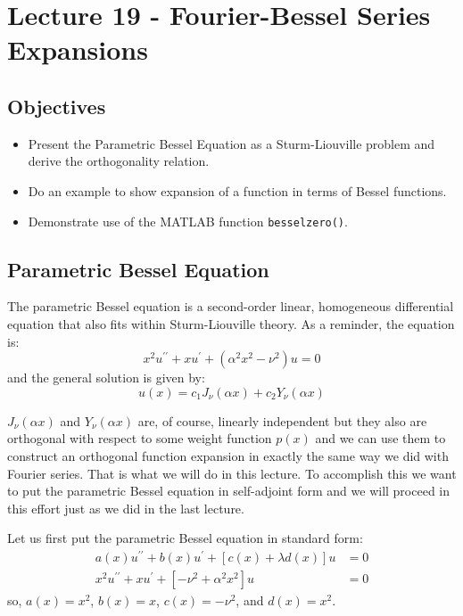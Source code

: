 \chapter{Lecture 19 - Fourier-Bessel Series Expansions}
\label{ch:lec19}
\section{Objectives}
\begin{itemize}
\item Present the Parametric Bessel Equation as a Sturm-Liouville problem and derive the orthogonality relation.
\item Do an example to show expansion of a function in terms of Bessel functions.
\item Demonstrate use of the MATLAB function \lstinline{besselzero()}.
\end{itemize}

\section{Parametric Bessel Equation}
The parametric Bessel equation is a second-order linear, homogeneous differential equation that also fits within Sturm-Liouville theory.  As a reminder, the equation is:
\begin{equation*}
x^2u^{\prime \prime} + xu^{\prime} + \left(\alpha^2x^2-\nu^2\right)u = 0
\end{equation*}
and the general solution is given by:
\begin{equation*}
u(x) = c_1J_{\nu}(\alpha x) + c_2Y_{\nu}(\alpha x)
\end{equation*}

 $J_{\nu}(\alpha x)$ and $Y_{\nu}(\alpha x)$ are, of course, linearly independent but they also are orthogonal with respect to some weight function $p(x)$ and we can use them to construct an orthogonal function expansion in exactly the same way we did with Fourier series.  That is what we will do in this lecture.  To accomplish this we want to put the parametric Bessel equation in self-adjoint form and we will proceed in this effort just as we did in the last lecture.

\vspace{0.5cm}

\noindent Let us first put the parametric Bessel equation in standard form:
\begin{align*}
a(x)u^{\prime \prime} + b(x)u^{\prime} + \left[c(x)+\lambda d(x) \right] u &= 0 \\
x^2u^{\prime \prime} + xu^{\prime} + \left[-\nu^2 + \alpha^2 x^2\right]u &=0
\end{align*}
so, $a(x) = x^2$, $b(x)=x$, $c(x) = -\nu^2$, and $d(x)=x^2$.

